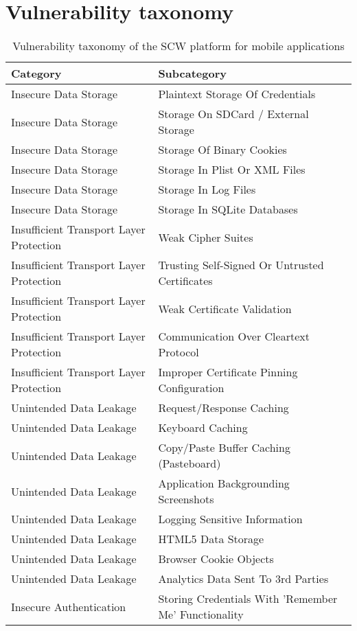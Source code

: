 \chapter{Vulnerability taxonomy}
\label{app:categories}

\begin{longtable}{p{} | p{} } 
\caption[SCW vulnerability taxonomy for mobile]{Vulnerability taxonomy of the SCW platform for mobile applications}
 \textbf{Category} & \textbf{Subcategory} \\
 \hline
Insecure Data Storage& Plaintext Storage Of Credentials\\
Insecure Data Storage& Storage On SDCard / External Storage\\
Insecure Data Storage& Storage Of Binary Cookies\\
Insecure Data Storage& Storage In Plist Or XML Files\\
Insecure Data Storage& Storage In Log Files\\
Insecure Data Storage& Storage In SQLite Databases\\
Insufficient Transport Layer Protection& Weak Cipher Suites\\
Insufficient Transport Layer Protection& Trusting Self-Signed Or Untrusted Certificates\\
Insufficient Transport Layer Protection& Weak Certificate Validation\\
Insufficient Transport Layer Protection& Communication Over Cleartext Protocol\\
Insufficient Transport Layer Protection& Improper Certificate Pinning Configuration\\
Unintended Data Leakage& Request/Response Caching\\
Unintended Data Leakage& Keyboard Caching\\
Unintended Data Leakage& Copy/Paste Buffer Caching (Pasteboard)\\
Unintended Data Leakage& Application Backgrounding Screenshots\\
Unintended Data Leakage& Logging Sensitive Information\\
Unintended Data Leakage& HTML5 Data Storage\\
Unintended Data Leakage& Browser Cookie Objects\\
Unintended Data Leakage& Analytics Data Sent To 3rd Parties\\
Insecure Authentication& Storing Credentials With 'Remember Me' Functionality\\

\end{longtable}
